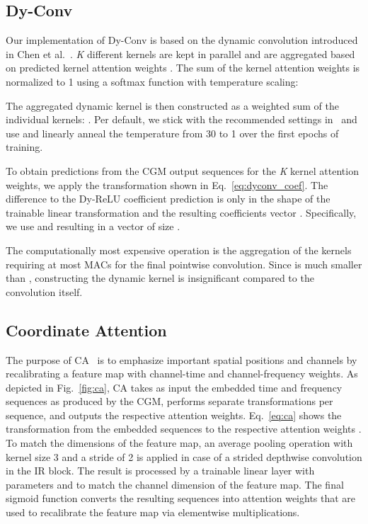 \documentclass[lettersize,journal]{IEEEtran}
\begin{document}
\subsection{Dy-Conv}
\label{subsec:dyconv}

Our implementation of Dy-Conv is based on the dynamic convolution introduced in Chen et al.~\cite{chen2020dynamic_conv}. \textit{K} different kernels are kept in parallel and are aggregated based on predicted kernel attention weights . The sum of the kernel attention weights is normalized to 1 using a softmax function with temperature scaling:

 

The aggregated dynamic kernel  is then constructed as a weighted sum of the  individual kernels: . Per default, we stick with the recommended settings in~\cite{chen2020dynamic_conv} and use  and linearly anneal the temperature  from 30 to 1 over the first epochs of training.

To obtain predictions from the CGM output sequences for the \textit{K} kernel attention weights, we apply the transformation shown in Eq.~\ref{eq:dyconv_coef}. The difference to the Dy-ReLU coefficient prediction is only in the shape of the trainable linear transformation and the resulting coefficients vector . Specifically, we use  and  resulting in a vector  of size .



The computationally most expensive operation is the aggregation of the  kernels requiring at most  MACs for the final pointwise convolution. Since  is much smaller than , constructing the dynamic kernel is insignificant compared to the convolution itself.

\subsection{Coordinate Attention}
\label{subsec:ca}

The purpose of CA~\cite{hou2021coordinate} is to emphasize important spatial positions and channels by recalibrating a feature map with channel-time and channel-frequency weights. As depicted in Fig.~\ref{fig:ca}, CA takes as input the embedded time and frequency sequences as produced by the CGM, performs separate transformations per sequence, and outputs the respective attention weights. Eq.~\ref{eq:ca} shows the transformation from the embedded sequences  to the respective attention weights . To match the dimensions of the feature map, an average pooling operation with kernel size 3 and a stride of 2 is applied in case of a strided depthwise convolution in the IR block. The result is processed by a trainable linear layer with parameters  and  to match the channel dimension of the feature map. The final sigmoid function converts the resulting sequences into attention weights that are used to recalibrate the feature map via elementwise multiplications.
\end{document}

